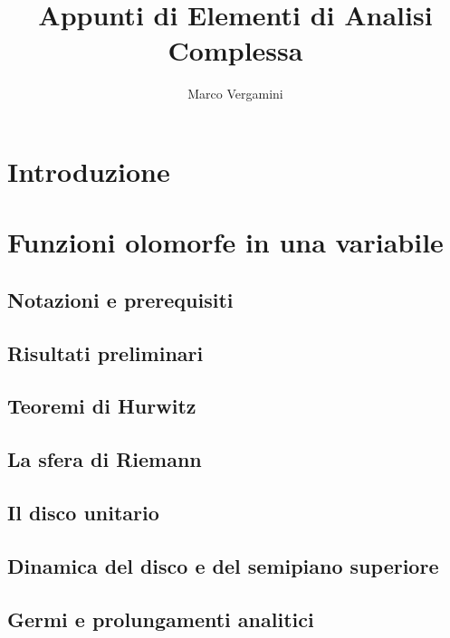 \documentclass{article}
\title{Appunti di Elementi di Analisi Complessa}
\date{}
\author{Marco Vergamini}
\begin{document}
\maketitle
\newpage
\tableofcontents
\newpage


\section*{Introduzione}


\newpage

\section{Funzioni olomorfe in una variabile}

\subsection{Notazioni e prerequisiti}


\subsection{Risultati preliminari}


\subsection{Teoremi di Hurwitz}


\subsection{La sfera di Riemann}


\subsection{Il disco unitario}


\subsection{Dinamica del disco e del semipiano superiore}


\subsection{Germi e prolungamenti analitici}

\end{document}

